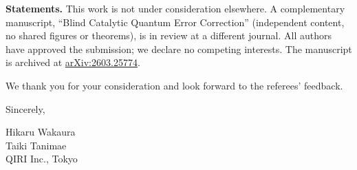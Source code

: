 \documentclass[11pt,a4paper]{article}
\begin{document}
\medskip

\textbf{Statements.}
This work is not under consideration elsewhere.
A complementary manuscript, ``Blind Catalytic Quantum Error Correction'' (independent content, no shared figures or theorems), is in review at a different journal.
All authors have approved the submission; we declare no competing interests.
The manuscript is archived at \href{https://doi.org/10.48550/arXiv.2603.25774}{arXiv:2603.25774}.

\medskip

We thank you for your consideration and look forward to the referees' feedback.

\medskip

Sincerely,

\vspace{0.4cm}
Hikaru Wakaura\\
Taiki Tanimae\\
QIRI Inc., Tokyo
\end{document}
